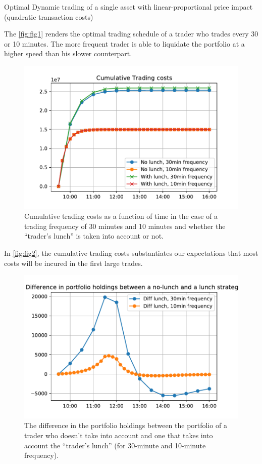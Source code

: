 \documentclass[10pt]{article}
\newenvironment{exercise}[2][Exercise]{\begin{trivlist}
  \item[\hskip \labelsep {\bfseries #1}\hskip \labelsep {\bfseries #2.}]}{\end{trivlist}}
\begin{document}
\begin{exercise}{3}{Optimal Dynamic trading of a single asset with linear-proportional price impact (quadratic transaction costs)}
\begin{itemize}
        The \autoref{fig:fig1} renders the optimal trading schedule of a trader
        who trades every 30 or 10 minutes. The more frequent trader is able to
        liquidate the portfolio at a higher speed than his slower counterpart.
        
        
        \begin{figure}[H]
          \centering
          \includegraphics[scale=0.6]{fig2.pdf}
          \caption{Cumulative trading costs as a function of time in the
            case of a trading frequency of 30 minutes and 10 minutes and whether the
          ``trader's lunch'' is taken into account or not.}
          \label{fig:fig2}
        \end{figure}
        In \autoref{fig:fig2}, the cumulative trading costs substantiates our
        expectations that most costs will be incured in the first large trades.


        
        \begin{figure}[H]
          \centering
          \includegraphics[scale=0.6]{fig3.pdf}
          \caption{The difference in the portfolio holdings between the
            portfolio of a trader who doesn't take into account and one that
            takes into account the ``trader's lunch'' (for 30-minute and
            10-minute frequency).}
          \label{fig:fig3}
        \end{figure}


\end{itemize}
\end{exercise}
\end{document}
